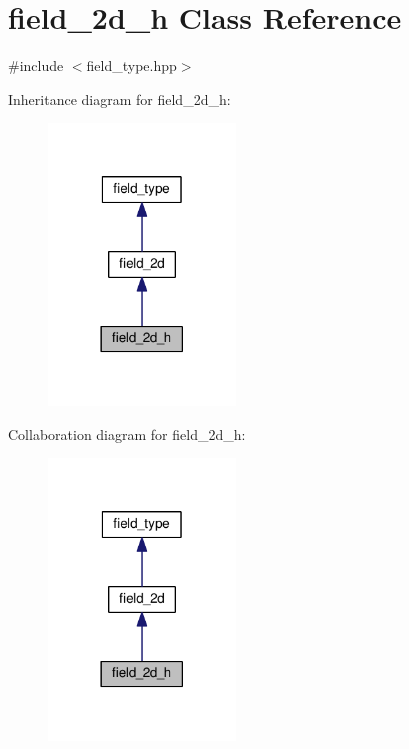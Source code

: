 \hypertarget{classfield__2d__h}{}\section{field\+\_\+2d\+\_\+h Class Reference}
\label{classfield__2d__h}


{\ttfamily \#include $<$field\+\_\+type.\+hpp$>$}



Inheritance diagram for field\+\_\+2d\+\_\+h\+:
\nopagebreak
\begin{figure}[H]
\begin{center}
\leavevmode
\includegraphics[width=141pt]{df/dde/classfield__2d__h__inherit__graph}
\end{center}
\end{figure}


Collaboration diagram for field\+\_\+2d\+\_\+h\+:
\nopagebreak
\begin{figure}[H]
\begin{center}
\leavevmode
\includegraphics[width=141pt]{d2/d67/classfield__2d__h__coll__graph}
\end{center}
\end{figure}
